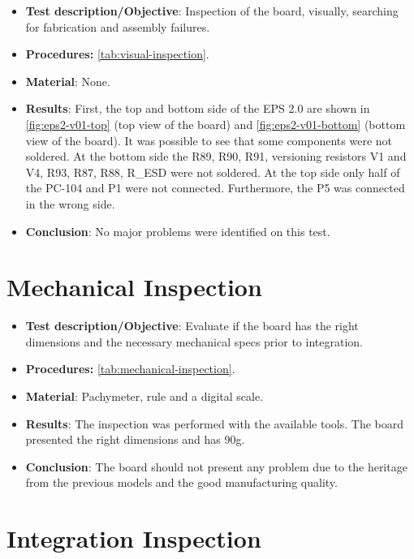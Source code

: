 \begin{itemize}
    \item \textbf{Test description/Objective}: Inspection of the board, visually, searching for fabrication and assembly failures.
    \item \textbf{Procedures:} \autoref{tab:visual-inspection}.
    \item \textbf{Material}: None.
    \item \textbf{Results}: First, the top and bottom side of the EPS 2.0 are shown in \autoref{fig:eps2-v01-top} (top view of the board) and \autoref{fig:eps2-v01-bottom} (bottom view of the board). It was possible to see that some components were not soldered. At the bottom side the R89, R90, R91, versioning resistors V1 and V4, R93, R87, R88, R\_ESD were not soldered. At the top side only half of the PC-104 and P1 were not connected. Furthermore, the P5 was connected in the wrong side.
    \item \textbf{Conclusion}: No major problems were identified on this test.  
\end{itemize}

\newpage

\section{Mechanical Inspection}

\begin{itemize}
    \item \textbf{Test description/Objective}: Evaluate if the board has the right dimensions and the necessary mechanical specs prior to integration.
    \item \textbf{Procedures:} \autoref{tab:mechanical-inspection}.
    \item \textbf{Material}: Pachymeter, rule and a digital scale.
    \item \textbf{Results}: The inspection was performed with the available tools. The board presented the right dimensions and has 90g.
    \item \textbf{Conclusion}: The board should not present any problem due to the heritage from the previous models and the good manufacturing quality.
\end{itemize}


\section{Integration Inspection}

